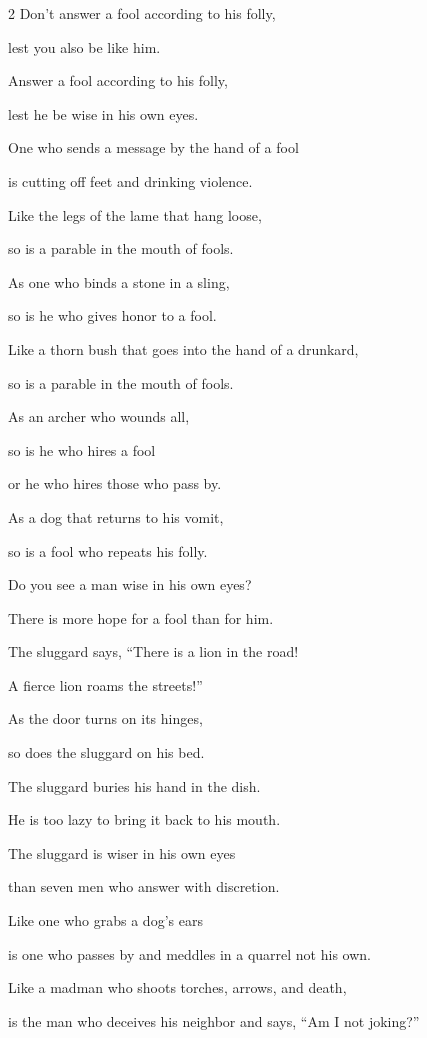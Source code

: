 \begin{multicols}{2}
\myverse{}Don’t answer a fool according to his folly,

lest you also be like him.


\myverse{}Answer a fool according to his folly,

lest he be wise in his own eyes.


\myverse{}One who sends a message by the hand of a fool

is cutting off feet and drinking violence.


\myverse{}Like the legs of the lame that hang loose,

so is a parable in the mouth of fools.


\myverse{}As one who binds a stone in a sling,

so is he who gives honor to a fool.


\myverse{}Like a thorn bush that goes into the hand of a drunkard,

so is a parable in the mouth of fools.


\myverse{}As an archer who wounds all,

so is he who hires a fool

or he who hires those who pass by.


\myverse{}As a dog that returns to his vomit,

so is a fool who repeats his folly.


\myverse{}Do you see a man wise in his own eyes?

There is more hope for a fool than for him.


\myverse{}The sluggard says, “There is a lion in the road!

A fierce lion roams the streets!”


\myverse{}As the door turns on its hinges,

so does the sluggard on his bed.


\myverse{}The sluggard buries his hand in the dish.

He is too lazy to bring it back to his mouth.


\myverse{}The sluggard is wiser in his own eyes

than seven men who answer with discretion.


\myverse{}Like one who grabs a dog’s ears

is one who passes by and meddles in a quarrel not his own.


\myverse{}Like a madman who shoots torches, arrows, and death,


\myverse{}is the man who deceives his neighbor and says, “Am
I not joking?”



\end{multicols}
